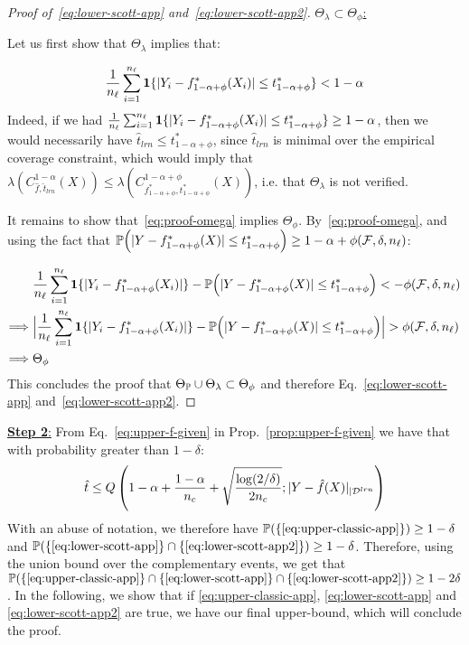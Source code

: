 \begin{proof}[Proof of~\eqref{eq:lower-scott-app} and~\eqref{eq:lower-scott-app2}]
    \underline{$\Theta_\lambda\subset  \Theta_\phi$:}

    Let us first show that $\Theta_\lambda$ implies that:

    \begin{equation}
        \label{eq:proof-omega}
        \frac{1}{n_\ell}\sum_{i=1}^{n_\ell}\mathbf{1}\{|Y_i-f^*_{1-\alpha+\phi}(X_i)|\leq t^*_{1-\alpha+\phi}\} < 1-\alpha
    \end{equation}
    Indeed, if we had $\frac{1}{n_\ell}\sum_{i=1}^{n_\ell}\mathbf{1}\{|Y_i-f^*_{1-\alpha+\phi}(X_i)|\leq t^*_{1-\alpha+\phi}\} \geq 1-\alpha$, then we would necessarily have $\hat{t}_{lrn} \leq t^*_{1-\alpha+\phi}$, since $\hat{t}_{lrn}$ is minimal over the empirical coverage constraint, which would imply that $\lambda\left(C_{\hat{f},\hat{t}_{lrn}}^{1-\alpha}(X)\right) \leq \lambda\left(C_{f_{1-\alpha+\phi}^*,t_{1-\alpha+\phi}^*}^{1-\alpha + \phi}(X)\right)$, i.e. that $\Theta_\lambda$ is not verified.

    It remains to show that~\eqref{eq:proof-omega} implies $\Theta_\phi$. By~\eqref{eq:proof-omega}, and using the fact that ${\mathbb{P}}\Big(|Y-f^*_{1-\alpha+\phi}(X)|\leq t^*_{1-\alpha+\phi}\Big)\geq 1- \alpha + {\phi(\mathcal{F},\delta,n_\ell)}$: 

    \begin{align*}
        &\frac{1}{n_\ell}\sum_{i=1}^{n_\ell}\mathbf{1}\{|Y_i-f^*_{1-\alpha+\phi}(X_i)|\} - {\mathbb{P}}\Big(|Y-f^*_{1-\alpha+\phi}(X)|\leq t^*_{1-\alpha+\phi}\Big) < - {\phi(\mathcal{F},\delta,n_\ell)} \\
        \Longrightarrow \hspace{0.1cm}& \Big|\frac{1}{n_\ell}\sum_{i=1}^{n_\ell}\mathbf{1}\{|Y_i-f^*_{1-\alpha+\phi}(X_i)|\} - {\mathbb{P}}\Big(|Y-f^*_{1-\alpha+\phi}(X)|\leq t^*_{1-\alpha+\phi}\Big)\Big| > {\phi(\mathcal{F},\delta,n_\ell)} \\
        \Longrightarrow \hspace{0.1cm}& \Theta_\phi
    \end{align*}
    This concludes the proof that $\Theta_{\mathbb{P}}\cup\Theta_\lambda \subset \Theta_\phi$ and therefore Eq.~\eqref{eq:lower-scott-app} and~\eqref{eq:lower-scott-app2}.
    \end{proof}
 
    
    \underline{\textbf{Step 2}:} From Eq.~\eqref{eq:upper-f-given} in Prop.~\ref{prop:upper-f-given} we have that with probability greater than $1-\delta$:
    \begin{equation}
        \label{eq:upper-classic-app}
        \hat{t}\leq Q\left(1-\alpha + \frac{1-\alpha}{n_c} + \sqrt{\frac{\log(2/\delta)}{2n_c}}; |Y-\hat{f}(X)|_{|{\cal D}^{lrn}}\right)
    \end{equation}
  With an abuse of notation, we therefore have ${\mathbb{P}}(\{\eqref{eq:upper-classic-app}\})\geq 1-\delta$ and ${\mathbb{P}}(\{\eqref{eq:lower-scott-app}\}\cap\{\eqref{eq:lower-scott-app2}\})\geq 1-\delta$. Therefore, using the union bound over the complementary events, we get that ${\mathbb{P}}(\{\eqref{eq:upper-classic-app}\}\cap\{\eqref{eq:lower-scott-app}\}\cap\{\eqref{eq:lower-scott-app2}\})\geq 1-2\delta$. In the following, we show that if \eqref{eq:upper-classic-app}, \eqref{eq:lower-scott-app} and \eqref{eq:lower-scott-app2} are true, we have our final upper-bound, which will conclude the proof.
    
